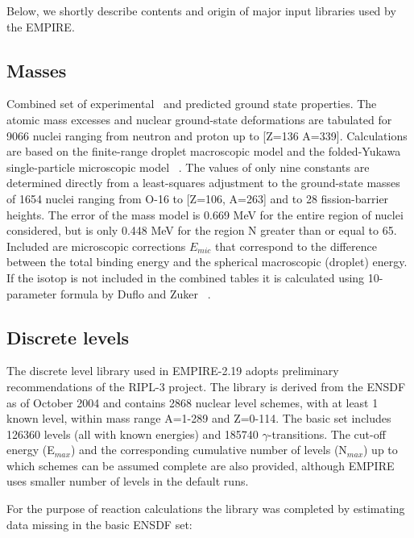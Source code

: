 Below, we shortly describe contents and origin of major input libraries used
by the EMPIRE.

\subsection{Masses}

Combined set of experimental~\cite{Audi} and predicted ground state
properties. The atomic mass excesses and nuclear ground-state deformations
are tabulated for 9066 nuclei ranging from neutron and proton up to {[}Z=136
A=339{]}. Calculations are based on the finite-range droplet macroscopic
model and the folded-Yukawa single-particle microscopic model~\cite{Moller95}%
. The values of only nine constants are determined directly from a
least-squares adjustment to the ground-state masses of 1654 nuclei ranging
from O-16 to {[}Z=106, A=263{]} and to 28 fission-barrier heights. The error
of the mass model is 0.669 MeV for the entire region of nuclei considered,
but is only 0.448 MeV for the region N greater than or equal to 65. Included
are microscopic corrections $E_{mic}$ that correspond to the difference
between the total binding energy and the spherical macroscopic (droplet)
energy. If the isotop is not included in the combined tables it is
calculated using 10-parameter formula by Duflo and Zuker ~\cite{Duflo:96}.

\subsection{Discrete levels}

The discrete level library used in EMPIRE-2.19 adopts preliminary
recommendations of the RIPL-3 project. The library is derived from the ENSDF
as of October 2004 and contains 2868 nuclear level schemes, with at least 1
known level, within mass range A=1-289 and Z=0-114. The basic set includes
126360 levels (all with known energies) and 185740 $\gamma$-transitions. The
cut-off energy (E$_{{max}}$) and the corresponding cumulative number of
levels (N$_{{max}}$) up to which schemes can be assumed complete are also
provided, although EMPIRE uses smaller number of levels in the default runs.

For the purpose of reaction calculations the library was completed by
estimating data missing in the basic ENSDF set:

